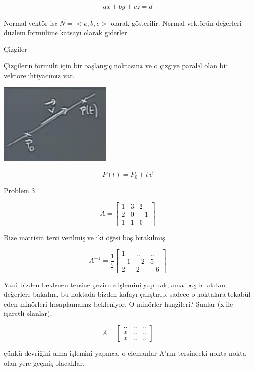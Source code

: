 \documentclass[12pt,fleqn]{article}\usepackage{../../common}
\begin{document}
$$ ax + by + cz  = d $$

Normal vektör ise $\vec{N} = < a,b,c >$ olarak gösterilir. Normal vektörün
değerleri düzlem formülüne katsayı olarak giderler.

Çizgiler

Çizgilerin formülü için bir başlangıç noktasına ve o çizgiye paralel olan bir
vektöre ihtiyacımız var.

\begin{center}
\includegraphics[height=4cm]{7_2.png}
\end{center}

$$ P(t) = P_0 + t \vec{v} $$

Problem 3

$$ A = 
\left[\begin{array}{rrr}
1 & 3 & 2 \\
2 & 0 & -1 \\
1 & 1 & 0
\end{array}\right]
 $$

Bize matrisin tersi verilmiş ve iki öğesi boş bırakılmış

$$ A^{-1} = \frac{1}{2}
\left[\begin{array}{rrr}
1 & .. & .. \\
-1 & -2 & 5 \\
2 & 2 & -6
\end{array}\right]
 $$

Yani bizden beklenen tersine çevirme işlemini yapmak, ama boş bırakılan
değerlere bakalım, bu noktada bizden kafayı çalıştırıp, sadece o noktalara
tekabül eden minörleri hesaplamamız bekleniyor. O minörler hangileri? Şunlar (x
ile işaretli olanlar).

$$ A = 
\left[\begin{array}{rrr}
.. & .. & ..\\
x & .. & ..\\
x & .. & ..
\end{array}\right]
 $$

çünkü devriğini alma işlemini yapınca, o elemanlar A'nın tersindeki nokta nokta
olan yere geçmiş olacaklar.
\end{document}
